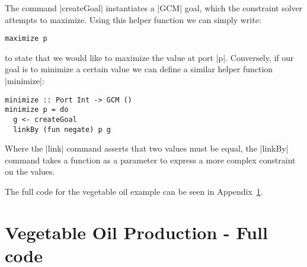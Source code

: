 \documentclass[a4paper]{article}
\begin{document}
The command |createGoal| instantiates a |GCM| goal, which the constraint
solver attempts to maximize. Using this helper function we can simply write:
\begin{verbatim}
maximize p
\end{verbatim}
to state that we would like to maximize the value at port |p|. Conversely, if
our goal is to minimize a certain value we can define a similar helper function
|minimize|:
\begin{verbatim}
minimize :: Port Int -> GCM ()
minimize p = do
  g <- createGoal
  linkBy (fun negate) p g
\end{verbatim}
Where the |link| command asserts that two values must be equal, the |linkBy|
command takes a function as a parameter to express a more complex constraint on
the values.

The full code for the vegetable oil example can be seen in Appendix~\ref{oilcode}.


\appendix

\section{Vegetable Oil Production - Full code}\label{oilcode}

\inputminted[linenos]{haskell}{examples/OilCrops.hs}
\end{document}
